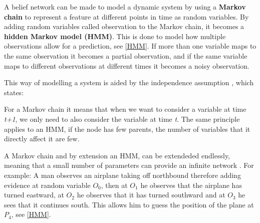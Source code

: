 A belief network can be made to model a dynamic system by using a \textbf{Markov
chain} to represent a feature at different points in time as random
variables. By adding random variables called observation to the
Markov chain, it becomes a \textbf{hidden Markov model (HMM)}. This is done to
model how multiple observations allow for a prediction, see \autoref{HMM}. If
more than one variable maps to the same observation it becomes a partial
observation, and if the same variable maps to different observations at
different times it becomes a noisy observation\citep[ch.6.5.2]{MIBook}.

This way of modelling a system is aided by the independence assumption
\citep[p.240]{MIBook}, which states:
 
 \begin{center}
 \begin{minipage}{0.8\linewidth}
 \end{minipage}
 \end{center}
 
For a Markov chain it means that when we want to consider a variable at time
\textit{t+1}, we only need to also consider the variable at time
\textit{t}. The same principle applies to an HMM, if the node has few parents,
the number of variables that it directly affect it are few.\nl

A Markov chain and by extension an HMM, can be extendeded endlessly, meaning
that a small number of parameters can provide an infinite network
\citep[ch.6.5.1]{MIBook}. For example: A man observes an airplane taking off
northbound therefore adding evidence at random variable $O_0$, then at $O_1$ he
observes that the airplane has turned eastward, at $O_2$ he observes that it
has turned southward and at $O_3$ he sees that it continues south. This allows
him to guess the position of the plane at $P_4$, see \autoref{HMM}. 





